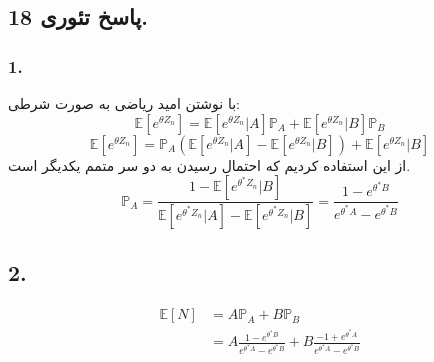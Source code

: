 \documentclass[]{article}
\begin{document}
\subsection{پاسخ تئوری 18.}
\subsubsection{1.}
با نوشتن امید ریاضی به صورت شرطی:
\begin{equation}
	\nonumber
	\mathbb{E}[e^{\theta Z_n}] = \mathbb{E}[e^{\theta Z_n} | A] \mathbb{P}_A + \mathbb{E}[e^{\theta Z_n} | B] \mathbb{P}_B
\end{equation}
\begin{equation}
	\nonumber
	\mathbb{E}[e^{\theta Z_n}] = \mathbb{P}_A (\mathbb{E}[e^{\theta Z_n} | A] - \mathbb{E}[e^{\theta Z_n} | B]) + \mathbb{E}[e^{\theta Z_n} | B] 
\end{equation}
از این استفاده کردیم که احتمال رسیدن به دو سر متمم یکدیگر است.
\begin{equation}
	\nonumber
	\mathbb{P}_A = \frac{1 - \mathbb{E}[e^{\theta^*Z_n }|B]}{\mathbb{E}[e^{\theta^*Z_n }|A] - \mathbb{E}[e^{\theta^*Z_n}|B]} =  \frac{1 - e^{\theta^*B}}{e^{\theta^*A} - e^{\theta^*B}}
\end{equation}
\subsection{2.}
\begin{equation}
	\nonumber
	\begin{split}
		\mathbb{E}[N] &= A \mathbb{P}_A + B \mathbb{P}_B\\
		&= A \frac{1 - e^{\theta^*B}}{e^{\theta^*A} - e^{\theta^*B}} + B \frac{-1 + e^{\theta^*A}}{e^{\theta^*A} - e^{\theta^*B}}
	\end{split}
\end{equation}
\newpage
\end{document}
